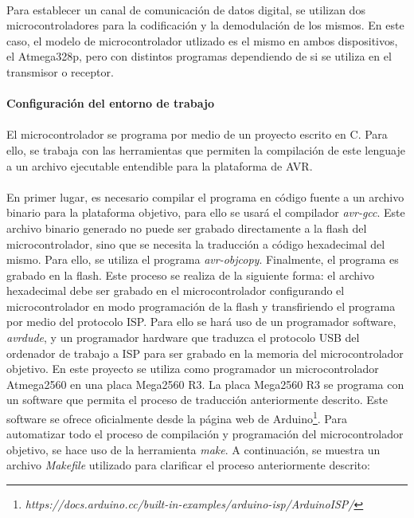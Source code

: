 \paragraph{}
Para establecer un canal de comunicación de datos digital, se utilizan dos microcontroladores para la codificación y la demodulación de los mismos. En este caso, el modelo de microcontrolador utlizado es el mismo en ambos dispositivos, el Atmega328p, pero con distintos programas dependiendo de si se utiliza en el transmisor o receptor.

\paragraph{Configuraci\'on del entorno de trabajo}
\paragraph{}
El microcontrolador se programa por medio de un proyecto escrito en C. Para ello, se trabaja con las herramientas que permiten la compilación de este lenguaje a un archivo ejecutable entendible para la plataforma de AVR.
\paragraph{}
En primer lugar, es necesario compilar el programa en c\'odigo fuente a un archivo binario para la plataforma objetivo, para ello se usar\'a el compilador \textit{avr-gcc}. Este archivo binario generado no puede ser grabado directamente a la flash del microcontrolador, sino que se necesita la traducción a código hexadecimal del mismo. Para ello, se utiliza el programa \textit{avr-objcopy}. 
Finalmente, el programa es grabado en la flash. Este proceso se realiza de la siguiente forma: el archivo hexadecimal debe ser grabado en el microcontrolador configurando el microcontrolador en modo programaci\'on de la flash y transfiriendo el programa por medio del protocolo ISP. Para ello se har\'a uso de un programador software, \textit{avrdude}, y un programador hardware que traduzca el protocolo USB del ordenador de trabajo a ISP para ser grabado en la memoria del microcontrolador objetivo. En este proyecto se utiliza como programador un microcontrolador Atmega2560 en una placa Mega2560 R3. 
La placa Mega2560 R3 se programa con un software que permita el proceso de traducción anteriormente descrito. Este software se ofrece oficialmente desde la p\'agina web de Arduino\footnote{\textit{https://docs.arduino.cc/built-in-examples/arduino-isp/ArduinoISP/}}.
Para automatizar todo el proceso de compilaci\'on y programaci\'on del microcontrolador objetivo, se hace uso de la herramienta \textit{make}. A continuaci\'on, se muestra un archivo \textit{Makefile} utilizado para clarificar el proceso anteriormente descrito:

